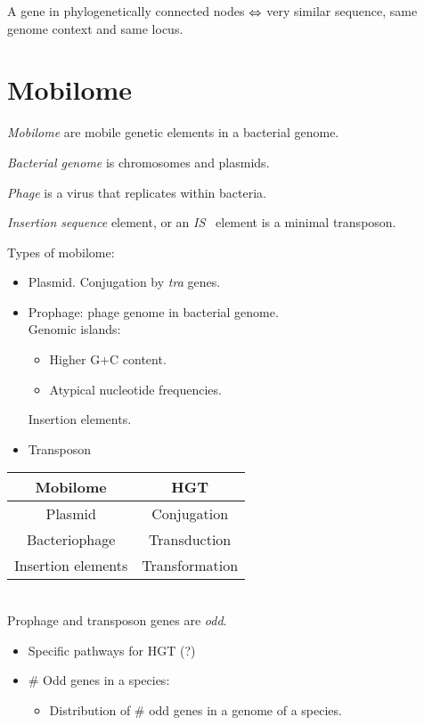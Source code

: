 \documentclass[10pt,a4paper]{article}
\theoremstyle{plain} \newtheorem{Lem}{Lemma}
\begin{document}
A gene in phylogenetically connected nodes $\Leftrightarrow$ very similar sequence, same genome context and same locus.



\section{Mobilome}
{\em Mobilome} are mobile genetic elements in a bacterial genome.

{\em Bacterial genome} is chromosomes and plasmids.

{\em Phage} is a virus that replicates within bacteria.

{\em Insertion sequence} element, or an {\em IS} \ element is a minimal transposon.

Types of mobilome:
\begin{itemize}
  \item Plasmid. Conjugation by {\em tra} genes.
  \item Prophage: phage genome in bacterial genome.
        \\
        Genomic islands:
        \begin{itemize}
          \item Higher G+C content.
          \item Atypical nucleotide frequencies.
        \end{itemize}
        Insertion elements.
  \item Transposon
\end{itemize}

\begin{tabular}{|c|c|}
\hline Mobilome & HGT \\
\hline
\hline Plasmid & Conjugation \\
\hline Bacteriophage & Transduction \\
\hline Insertion elements & Transformation \\
\hline
\end{tabular}
\\


Prophage and transposon genes are {\em odd}.


\Questions
\begin{itemize}
  \item Specific pathways for HGT (?)
  \item \# Odd genes in a species:
    \begin{itemize}
  	  \item Distribution of \# odd genes in a genome of a species.
    \end{itemize}
\end{itemize}
\end{document}
